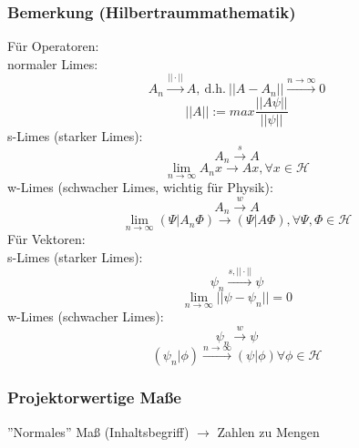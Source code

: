 \documentclass[twoside,a4paper]{scrartcl}
\renewcommand{\1}{\mathds{1}}
\newcommand{\Ra}{\Rightarrow}
\newcommand{\ra}{\rightarrow}
\renewcommand{\H}{\mathcal{H}}
\begin{document}
\subsubsection*{Bemerkung (Hilbertraummathematik)}
Für Operatoren:\\
normaler Limes:\\
$$A_n \stackrel{||\cdot||}{\ra} A, \ \mathrm{d.h.} \ ||A-A_n|| \stackrel{n \ra \infty}{\ra}0 $$
$$||A||:= max \frac{||A\psi||}{||\psi||}$$
s-Limes (starker Limes):\\
$$A_n \stackrel{s}{\ra} A$$
$$\lim_{n \ra \infty}A_nx \ra Ax, \forall x \in \H$$
w-Limes (schwacher Limes, wichtig für Physik):\\
$$A_n \stackrel{w}{\ra} A$$
$$\lim_{n \ra \infty} (\Psi|A_n \Phi) \ra (\Psi|A \Phi), \forall \Psi, \Phi \in \H$$
Für Vektoren:\\   
s-Limes (starker Limes):\\
$$\psi_n \stackrel{s,||\cdot||}{\ra} \psi$$         
$$\lim_{n \ra \infty}||\psi-\psi_n||=0$$
w-Limes (schwacher Limes):\\
$$\psi_n \stackrel{w}{\ra} \psi$$
$$(\psi_n|\phi) \stackrel{n \ra \infty}{\ra} (\psi| \phi)  \forall \phi \in \H$$

\subsubsection*{Projektorwertige Maße}
''Normales'' Maß (Inhaltsbegriff) $\ra$ Zahlen zu Mengen
\end{document}
